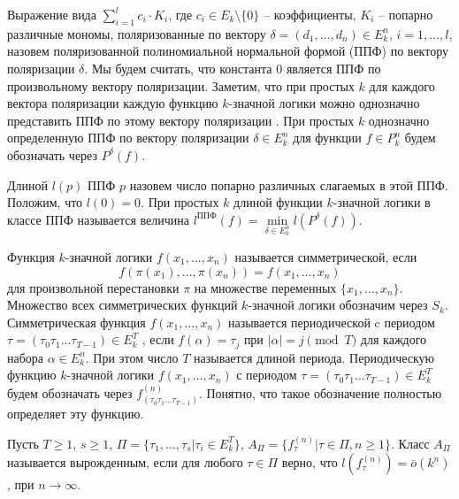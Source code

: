 \documentclass[bibliography=totoc, a4paper, 14pt]{extarticle}
\newcommand{\rol} {\textrm{rol}}
\begin{document}
Выражение вида $\sum\limits_{i=1}^lc_i \cdot K_i$, где $c_i \in E_k\setminus\{0\}$ -- коэффициенты, $K_i$ -- попарно
различные мономы, поляризованные по вектору $\delta = (d_1, \dots, d_n) \in E_k^n$, $i = 1, \dots , l$, назовем
поляризованной полиномиальной нормальной формой (ППФ) по вектору поляризации $\delta$. Мы будем считать, что константа 0
является ППФ по произвольному вектору поляризации. Заметим, что при простых $k$ для каждого вектора поляризации каждую функцию
$k$\nobreakdash-значной логики можно однозначно представить ППФ по этому вектору поляризации \cite{ss02}. При простых $k$
однозначно определенную ППФ по вектору поляризации $\delta \in E_k^n$ для функции
$f \in P_k^n$ будем обозначать через $P^{\delta}(f)$.

Длиной $l(p)$ ППФ $p$ назовем число попарно различных слагаемых в этой
ППФ. Положим, что $l(0) = 0$. При простых $k$ длиной функции $k$\nobreakdash-значной
логики в классе ППФ называется величина $l^{\text{ППФ}}(f) = \min\limits_{\delta \in E_k^n}l(P^{\delta}(f))$.

Функция $k$\nobreakdash-значной логики $f(x_1 ,\dots , x_n)$ называется симметрической, если
$$f(\pi(x_1), \dots, \pi(x_n)) = f(x_1, \dots, x_n)$$
для произвольной перестановки $\pi$ на множестве переменных $\{x_1 , \dots , x_n \}$.
Множество всех симметрических функций $k$\nobreakdash-значной логики обозначим через $S_k$.
Симметрическая функция $f(x_1, \dots, x_n)$ называется периодической c
периодом $\tau = (\tau_0 \tau_1 \dots \tau_{T-1}) \in E_k^T$ , если $f(\alpha) = \tau_j$ при $|\alpha| = j \pmod T$
для каждого набора $\alpha \in E_k^n$. При этом число $T$ называется длиной периода. Периодическую функцию
$k$\nobreakdash-значной логики $f(x_1 , \dots , x_n)$ с периодом $\tau = (\tau_0 \tau_1 \dots \tau_{T-1}) \in E_k^T$
будем обозначать через $f^{(n)}_{(\tau_0 \tau_1 \dots \tau_{T-1})}$. Понятно, что
такое обозначение полностью определяет эту функцию.


Пусть $T \geqslant  1$, $s \geqslant 1$, $\Pi = \{\tau_1, \dots, \tau_s | \tau_i \in E_k^T\}$,
$A_{\Pi} = \{f_{\tau}^{(n)}|\tau \in \Pi, n \geqslant 1\}$. Класс $A_{\Pi}$ называется вырожденным,
если для любого $\tau \in \Pi$ верно, что $l(f_{\tau}^{(n)}) = \bar{o}(k^n)$, при $n\rightarrow
\infty$.
\end{document}
